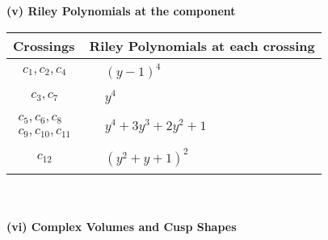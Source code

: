 \documentclass[1p]{elsarticle_modified}
\theoremstyle{definition}
\begin{document}
\newpage\renewcommand{\arraystretch}{1}
\flushleft \textbf{(v) Riley Polynomials at the component}\newline \\
\begin{tabular}{m{50pt}|m{274pt}}
Crossings & \hspace{64pt}Riley Polynomials at each crossing \\
\hline $$\begin{aligned}c_{1},c_{2},c_{4}\end{aligned}$$&$\begin{aligned}
&(y-1)^4
\end{aligned}$\\
\hline $$\begin{aligned}c_{3},c_{7}\end{aligned}$$&$\begin{aligned}
&y^4
\end{aligned}$\\
\hline $$\begin{aligned}c_{5},c_{6},c_{8}\\c_{9},c_{10},c_{11}\end{aligned}$$&$\begin{aligned}
&y^4+3 y^3+2 y^2+1
\end{aligned}$\\
\hline $$\begin{aligned}c_{12}\end{aligned}$$&$\begin{aligned}
&(y^2+y+1)^2
\end{aligned}$\\
\hline
\end{tabular}\\~\\
\newpage\flushleft \textbf{(vi) Complex Volumes and Cusp Shapes}
\end{document}
